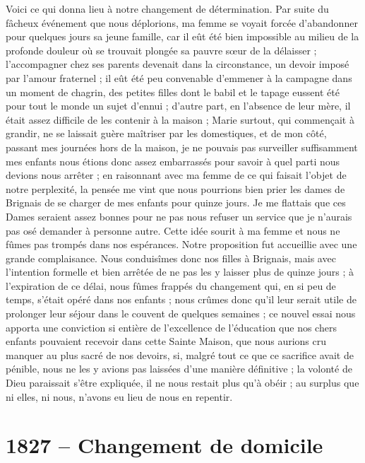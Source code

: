 \documentclass[11pt,a4paper]{report}
\begin{document}
Voici ce qui donna lieu à notre changement de détermination. Par suite du fâcheux événement que nous déplorions, ma femme se voyait forcée d'abandonner pour quelques jours sa jeune famille, car il eût été bien impossible au milieu de la profonde douleur où se trouvait plongée sa pauvre sœur de la délaisser ; l'accompagner chez ses parents devenait dans la circonstance, un devoir imposé par l'amour fraternel ; il eût été peu convenable d'emmener à la campagne dans un moment de chagrin, des petites filles dont le babil et le tapage eussent été pour tout le monde un sujet d'ennui ; d'autre part, en l'absence de leur mère, il était assez difficile de les contenir à la maison ; Marie surtout, qui commençait à grandir, ne se laissait guère maîtriser par les domestiques, et de mon côté, passant mes journées hors de la maison, je ne pouvais pas surveiller suffisamment mes enfants nous étions donc assez embarrassés pour savoir à quel parti nous devions nous arrêter ; en raisonnant avec ma femme de ce qui faisait l'objet de notre perplexité, la pensée me vint que nous pourrions bien prier les dames de Brignais de se charger de mes enfants pour quinze jours. Je me flattais que ces Dames seraient assez bonnes pour ne pas nous refuser un service que je n'aurais pas osé demander à personne autre. Cette idée sourit à ma femme et nous ne fûmes pas trompés dans nos espérances. Notre proposition fut accueillie avec une grande complaisance. Nous conduisîmes donc nos filles à Brignais, mais avec l'intention formelle et bien arrêtée de ne pas les y laisser plus de quinze jours ; à l'expiration de ce délai, nous fûmes frappés du changement qui, en si peu de temps, s'était opéré dans nos enfants ; nous crûmes donc qu'il leur serait utile de prolonger leur séjour dans le couvent de quelques semaines ; ce nouvel essai nous apporta une conviction si entière de l'excellence de l'éducation que nos chers enfants pouvaient recevoir dans cette Sainte Maison, que nous aurions cru manquer au plus sacré de nos devoirs, si, malgré tout ce que ce sacrifice avait de pénible, nous ne les y avions pas laissées d'une manière définitive ; la volonté de Dieu paraissait s'être expliquée, il ne nous restait plus qu'à obéir ; au surplus que ni elles, ni nous, n'avons eu lieu de nous en repentir.

\section*{1827 -- Changement de domicile}
\end{document}
